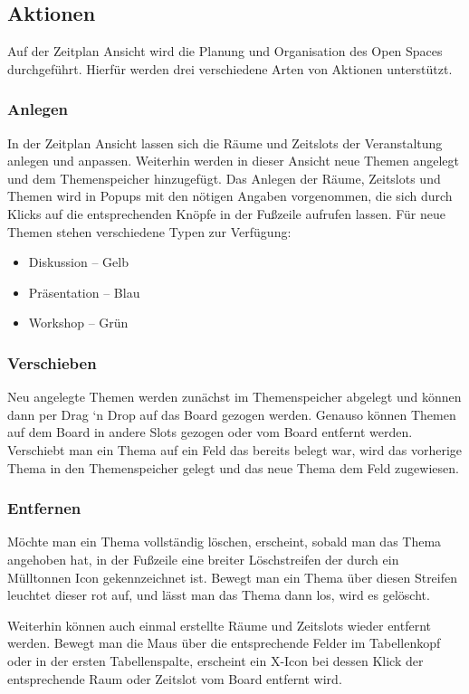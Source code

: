 \subsection{Aktionen}
Auf der Zeitplan Ansicht wird die Planung und Organisation des Open Spaces
durchgeführt. Hierfür werden drei verschiedene Arten von Aktionen unterstützt.
\subsubsection*{Anlegen}
In der Zeitplan Ansicht lassen sich die Räume und Zeitslots der Veranstaltung
anlegen und anpassen. Weiterhin werden in dieser Ansicht neue Themen angelegt
und dem Themenspeicher hinzugefügt. Das Anlegen der Räume, Zeitslots und Themen
wird in Popups mit den nötigen Angaben vorgenommen, die sich durch Klicks auf
die entsprechenden Knöpfe in der Fußzeile aufrufen lassen. Für neue Themen
stehen verschiedene Typen zur Verfügung:
\begin{itemize}
\item Diskussion -- Gelb
\item Präsentation -- Blau
\item Workshop -- Grün
\end{itemize}

\subsubsection*{Verschieben}
Neu angelegte Themen werden zunächst im Themenspeicher abgelegt und können dann
per Drag `n Drop auf das Board gezogen werden. Genauso können Themen auf dem
Board in andere Slots gezogen oder vom Board entfernt werden. Verschiebt man ein
Thema auf ein Feld das bereits belegt war, wird das vorherige Thema in den
Themenspeicher gelegt und das neue Thema dem Feld zugewiesen.

\subsubsection*{Entfernen}
Möchte man ein Thema vollständig löschen, erscheint, sobald man das Thema
angehoben hat, in der Fußzeile eine breiter Löschstreifen der durch ein
Mülltonnen Icon gekennzeichnet ist. Bewegt man ein Thema über diesen Streifen
leuchtet dieser rot auf, und lässt man das Thema dann los, wird es gelöscht.

Weiterhin können auch einmal erstellte Räume und Zeitslots wieder entfernt
werden. Bewegt man die Maus über die entsprechende Felder im Tabellenkopf oder
in der ersten Tabellenspalte, erscheint ein X-Icon bei dessen Klick der
entsprechende Raum oder Zeitslot vom Board entfernt wird.

